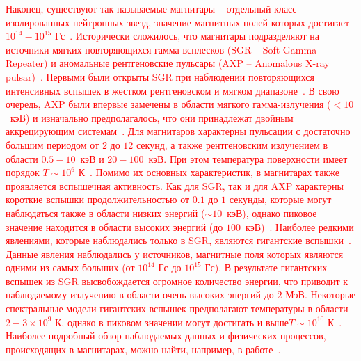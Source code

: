 \textcolor{red}{Наконец, существуют так называемые магнитары -- отдельный класс изолированных нейтронных звезд, значение магнитных полей которых достигает $10^{14} - 10^{15}$ Гс~\cite{Mitrofanov:1982,Duncan:1992,Thompson:1995,Thompson:1996,DongLai:2001,Lyutikov:2002}. Исторически сложилось, что магнитары подразделяют на источники мягких повторяющихся гамма-всплесков (SGR -- Soft Gamma-Repeater) и аномальные рентгеновские пульсары (AXP -- Anomalous \linebreak X-ray pulsar)~\cite{Kouveliotou:1998ze,Kouveliotou:1998fd,Gavriil:2002mc,Ibrahim:2002zw,Ibrahim:2002zy,Olausen:2014,vanParad:1995}. Первыми были открыты SGR при наблюдении повторяющихся интенсивных вспышек в жестком рентгеновском и мягком диапазоне~\cite{Mazets:1979}. В свою очередь, AXP были впервые замечены в области мягкого гамма-излучения ($<10$~кэВ) и изначально предполагалось, что они принадлежат двойным аккрецирующим системам~\cite{Mereghetti:1995}. Для магнитаров характерны пульсации с достаточно большим периодом от $2$ до $12$ секунд, а также рентгеновским излучением в области $0.5 - 10$~кэВ и $20 - 100$~кэВ. При этом температура поверхности имеет порядок $T\sim 10^6$ К~\cite{Yakovlev:2004}. Помимо их основных характеристик, в магнитарах также проявляется вспышечная активность. Как для SGR, так и для AXP характерны короткие вспышки продолжительностью от $0.1$  до $1$ секунды, которые могут наблюдаться также в области низких энергий ($\sim 10$~кэВ), однако пиковое значение находится в области высоких энергий (до $100$~кэВ)~\cite{Younes:2021}. Наиболее редкими явлениями, которые наблюдались только в SGR, являются гигантские вспышки~\cite{Mazets:1979,Hurley:1999,Hurley:1999b,Hurley:2005}. Данные явления наблюдались у источников, магнитные поля которых являются одними из самых больших (от $10^{14}$ Гс до $10^{15}$ Гс).  В результате гигантских вспышек из SGR высвобождается огромное количество энергии, что приводит к наблюдаемому излучению в области очень высоких энергий до $2$ МэВ. Некоторые спектральные модели гигантских вспышек предполагают температуры в области \mbox{$2-3\times 10^9$} К, однако в пиковом значении могут достигать и выше\linebreak $T\sim 10^{10}$ К~\cite{Hurley:1999}. Наиболее подробный обзор наблюдаемых данных и физических процессов, происходящих в магнитарах, можно найти, например, в работе~\cite{Kaspi:2017}. }

